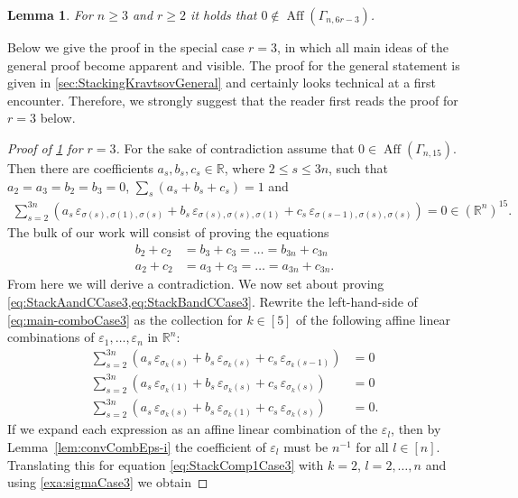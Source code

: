 \documentclass[10pt,a4paper]{article}
\newtheorem{lem}[thm]{Lemma}\crefname{lem}{Lemma}{Lemmas}
\numberwithin{equation}{section}
\DeclareMathOperator{\aff}{Aff}
\newcommand{\RR}{\mathbb R}
\newcommand{\eps}{\varepsilon}
\begin{document}
\begin{lem}\label{lem:convStackingKravtsov}
For $n \geq 3$ and $r \geq 2$ it holds that $0 \notin \aff \left( \Gamma_{n, 6 r - 3} \right)$.
\end{lem}

Below we give the proof in the special case $r=3$, in which all main ideas of the general proof become apparent and visible. The proof for the general statement is given in \cref{sec:StackingKravtsovGeneral} and certainly looks technical at a first encounter. Therefore, we strongly suggest that the reader first reads the proof for $r=3$ below. 



\begin{proof}[Proof of \cref{lem:convStackingKravtsov} for $r=3$]
For the sake of contradiction assume that $0 \in \aff(\Gamma_{n, 15})$. Then there are coefficients $a_s, b_s, c_s \in \RR$, where $2 \leq s \leq 3 n$, such that $a_2 = a_3 = b_2 = b_3 = 0$, $\sum_s (a_s + b_s + c_s) = 1$ and
	\begin{align}
	\sum_{s= 2}^{3 n} \left( a_s \, \eps_{\sigma(s),\sigma(1),\sigma(s)}
	+ b_s \, \eps_{\sigma(s),\sigma(s),\sigma(1)} + c_s \, \eps_{\sigma(s-1),\sigma(s),\sigma(s)}  \right) = 0 \in (\RR^n)^{15}.\label{eq:main-comboCase3}
	\end{align}
	The bulk of our work will consist of proving the equations
	\begin{align}\label{eq:StackBandCCase3}
	b_2 + c_2 &= b_3 + c_3 = \ldots = b_{3 n} + c_{3 n}\\
	\label{eq:StackAandCCase3} a_2 + c_2 &= a_3 + c_3 = \ldots = a_{3 n} + c_{3 n}.
	\end{align}
	From here we will derive a contradiction. We now set about proving \cref{eq:StackAandCCase3,eq:StackBandCCase3}. Rewrite the left-hand-side of \cref{eq:main-comboCase3} as the collection for $k \in [5]$ of the following affine linear combinations of $\eps_1,\ldots,\eps_n$ in $\RR^n$:
	\begin{align}
	\sum_{s= 2}^{3n} \left( a_s \, \eps_{\sigma_k(s)} 
	+ b_s \, \eps_{\sigma_k(s)} + c_s \, \eps_{\sigma_k(s-1)}  \right) &= 0 \label{eq:StackComp1Case3}\\
	\sum_{s= 2}^{3n} \left( a_s \, \eps_{\sigma_k(1)}
	+ b_s \, \eps_{\sigma_k(s)} + c_s \, \eps_{\sigma_k(s)}  \right) &= 0 \label{eq:StackComp2Case3} \\
	\sum_{s= 2}^{3n} \left( a_s \, \eps_{\sigma_k(s)}
	+ b_s \, \eps_{\sigma_k(1)} + c_s \, \eps_{\sigma_k(s)}  \right) &= 0. \label{eq:StackComp3Case3}
	\end{align}
If we expand each expression as an affine linear combination of the $\eps_l$, then by Lemma~\ref{lem:convCombEps-i} the coefficient of $\eps_l$ must be $n^{-1}$ for all $l \in [n]$. Translating this for equation \eqref{eq:StackComp1Case3} with $k = 2$, $l=2,\ldots,n$ and using \cref{exa:sigmaCase3} we obtain 



\end{proof}
\end{document}
